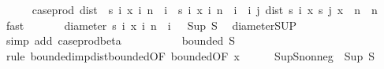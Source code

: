 \begin{isabellebody}
\ \ \ \ \isamarkupfalse%
\ {\isachardoublequoteopen}case{\isacharunderscore}{\kern0pt}prod\ dist\ {\isacharbackquote}{\kern0pt}\ {\isacharparenleft}{\kern0pt}{\isacharbraceleft}{\kern0pt}s\ i\ x\ {\isacharbar}{\kern0pt}i{\isachardot}{\kern0pt}\ n\ {\isasymle}\ i{\isacharbraceright}{\kern0pt}\ {\isasymtimes}\ {\isacharbraceleft}{\kern0pt}s\ i\ x\ {\isacharbar}{\kern0pt}i{\isachardot}{\kern0pt}\ n\ {\isasymle}\ i{\isacharbraceright}{\kern0pt}{\isacharparenright}{\kern0pt}\ {\isacharequal}{\kern0pt}\ {\isacharparenleft}{\kern0pt}{\isasymlambda}{\isacharparenleft}{\kern0pt}i{\isacharcomma}{\kern0pt}\ j{\isacharparenright}{\kern0pt}{\isachardot}{\kern0pt}\ dist\ {\isacharparenleft}{\kern0pt}s\ i\ x{\isacharparenright}{\kern0pt}\ {\isacharparenleft}{\kern0pt}s\ j\ x{\isacharparenright}{\kern0pt}{\isacharparenright}{\kern0pt}\ {\isacharbackquote}{\kern0pt}\ {\isacharparenleft}{\kern0pt}{\isacharbraceleft}{\kern0pt}n{\isachardot}{\kern0pt}{\isachardot}{\kern0pt}{\isacharbraceright}{\kern0pt}\ {\isasymtimes}\ {\isacharbraceleft}{\kern0pt}n{\isachardot}{\kern0pt}{\isachardot}{\kern0pt}{\isacharbraceright}{\kern0pt}{\isacharparenright}{\kern0pt}{\isachardoublequoteclose}\ \isamarkupfalse%
\ fast\isanewline
\ \ \ \ \isamarkupfalse%
\ {\isacharasterisk}{\kern0pt}{\isacharcolon}{\kern0pt}\ {\isachardoublequoteopen}diameter\ {\isacharbraceleft}{\kern0pt}s\ i\ x\ {\isacharbar}{\kern0pt}i{\isachardot}{\kern0pt}\ n\ {\isasymle}\ i{\isacharbraceright}{\kern0pt}\ {\isacharequal}{\kern0pt}\ \ Sup\ {\isacharquery}{\kern0pt}S{\isachardoublequoteclose}\ \isamarkupfalse%
\ diameter{\isacharunderscore}{\kern0pt}SUP\ \isamarkupfalse%
\ {\isacharparenleft}{\kern0pt}simp\ add{\isacharcolon}{\kern0pt}\ case{\isacharunderscore}{\kern0pt}prod{\isacharunderscore}{\kern0pt}beta{\isacharprime}{\kern0pt}{\isacharparenright}{\kern0pt}\isanewline
\ \ \ \ \isanewline
\ \ \ \ \isamarkupfalse%
\ {\isachardoublequoteopen}bounded\ {\isacharquery}{\kern0pt}S{\isachardoublequoteclose}\ \isamarkupfalse%
\ {\isacharparenleft}{\kern0pt}rule\ bounded{\isacharunderscore}{\kern0pt}imp{\isacharunderscore}{\kern0pt}dist{\isacharunderscore}{\kern0pt}bounded{\isacharbrackleft}{\kern0pt}OF\ bounded{\isacharbrackleft}{\kern0pt}OF\ x{\isacharbrackright}{\kern0pt}{\isacharbrackright}{\kern0pt}{\isacharparenright}{\kern0pt}\isanewline
\ \ \ \ \isamarkupfalse%
\ Sup{\isacharunderscore}{\kern0pt}S{\isacharunderscore}{\kern0pt}nonneg{\isacharcolon}{\kern0pt}{\isachardoublequoteopen}{}\ {\isasymle}\ Sup\ {\isacharquery}{\kern0pt}S{\isachardoublequoteclose}\ \isamarkupfalse%

\end{isabellebody}
